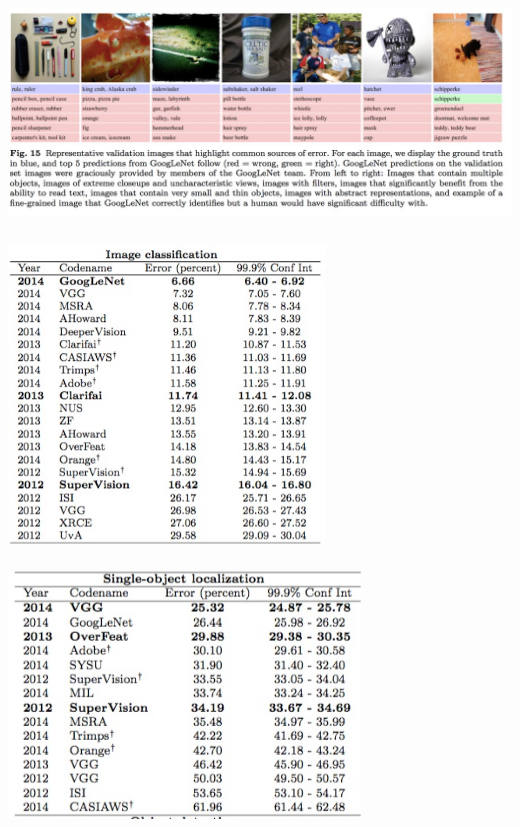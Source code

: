\documentclass[xetex,mathserif,serif,aspectratio=169]{beamer}
\begin{document}
\begin{frame}[fragile] \frametitle{} \oldB \small

\begin{center}
\includegraphics[width=\textwidth]{img/ilsvrcCommonErrors.jpg}
\end{center}

\end{frame}


\begin{frame}[fragile] \frametitle{} \oldB \small

\begin{center}
\includegraphics[width=0.63\textwidth]{img/ilsvrcClassRates.jpg}
\end{center}

\end{frame}


\begin{frame}[fragile] \frametitle{} \oldB \small

\begin{center}
\includegraphics[width=0.7\textwidth]{img/ilsvrcLocalRates.jpg}
\end{center}

\end{frame}
\end{document}
